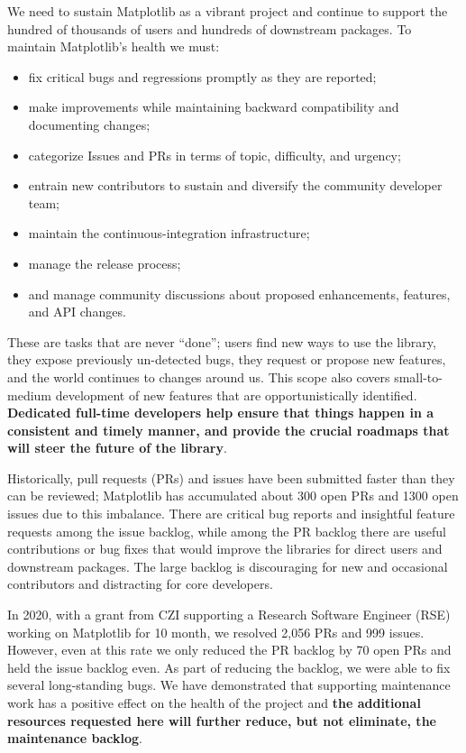 \documentclass[12pt]{article}
\numberwithin{page}{section}
\begin{document}
We need to sustain Matplotlib as a vibrant project and continue to support the
hundred of thousands of users and hundreds of downstream packages.  To maintain
Matplotlib's health we must:
\begin{itemize}[noitemsep]
\item fix critical bugs and regressions promptly as they are reported;
\item make improvements while maintaining backward compatibility and
  documenting changes;
\item categorize Issues and PRs in terms of topic, difficulty, and
  urgency;
\item entrain new contributors to sustain and diversify the community
  developer team;
\item maintain the continuous-integration infrastructure;
\item manage the release process;
\item and manage community discussions about proposed enhancements, features,
  and API changes.
\end{itemize}
These are tasks that are never ``done''; users find new ways to use the
library, they expose previously un-detected bugs, they request or propose new
features, and the world continues to changes around us.  This scope also covers
small-to-medium development of new features that are opportunistically
identified.  \textbf{Dedicated full-time developers help ensure that things
  happen in a consistent and timely manner, and provide the crucial roadmaps
  that will steer the future of the library}.


Historically, pull requests (PRs) and issues have been submitted
faster than they can be reviewed; Matplotlib has accumulated about 300
open PRs and 1300 open issues due to this imbalance. There are
critical bug reports and insightful feature requests among the issue
backlog, while among the PR backlog there are useful contributions or
bug fixes that would improve the libraries for direct users and
downstream packages.  The large backlog is discouraging for new and
occasional contributors and distracting for core developers.


In 2020, with a grant from CZI supporting a Research Software Engineer
(RSE) working on Matplotlib for 10 month, we resolved 2,056 PRs and
999 issues.  However, even at this rate we only reduced the PR backlog
by 70 open PRs and held the issue backlog even.  As part of reducing
the backlog, we were able to fix several long-standing bugs.  We have
demonstrated that supporting maintenance work has a positive effect on
the health of the project and \textbf{the additional resources
  requested here will further reduce, but not eliminate, the
  maintenance backlog}.
\end{document}
